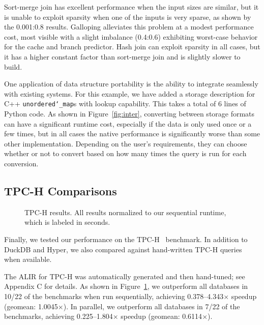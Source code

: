 \documentclass[acmsmall,screen,nonacm]{acmart}\settopmatter{printfolios=true,printccs=false,printacmref=false}
\begin{document}
Sort-merge join has excellent performance when the input sizes are similar, but it is unable to exploit sparsity when one of the inputs is very sparse, as shown by the 0.001:0.8 results. Galloping alleviates this problem at a modest performance cost, most visible with a slight imbalance (0.4:0.6) exhibiting worst-case behavior for the cache and branch predictor.
Hash join can exploit sparsity in all cases, but it has a higher constant factor than sort-merge join and is slightly slower to build.

One application of data structure portability is the ability to integrate seamlessly with existing systems. For this example, we have added a storage description for C++ \texttt{unordered\char`_map}s with lookup capability.
This takes a total of 6 lines of Python code. As shown in Figure~\ref{fig:inter},
converting between storage formats can have a significant runtime cost, especially if the data is only used once or a few times, but in all cases the native performance is significantly worse than some other implementation. Depending on the user's requirements, they can choose whether or not to convert based on how many times the query is run for each conversion.


\subsection{TPC-H Comparisons}
\label{sec:tpch}

\begin{figure}
    \centering
    \scalebox{0.5}{}
    \vspace{-0.5em}
    \caption{TPC-H results. All results normalized to our sequential runtime, which is labeled in seconds.}
    \label{fig:tpch}
    \vspace{-1em}
\end{figure}

Finally, we tested our performance on the TPC-H~\cite{tpch} benchmark.
In addition to DuckDB and Hyper, we also compared against hand-written
TPC-H queries~\cite{handwritten-tpch}
when available.

The ALIR for TPC-H was automatically generated and then hand-tuned; see Appendix C for details.
As shown in Figure~\ref{fig:tpch}, we outperform all databases in 10/22 of the benchmarks when run sequentially, achieving 0.378--4.343$\times$ speedup (geomean: 1.0045$\times$).
In parallel, we outperform all databases in 7/22 of the benchmarks,
achieving 0.225--1.804$\times$ speedup (geomean: 0.6114$\times$).
\end{document}
